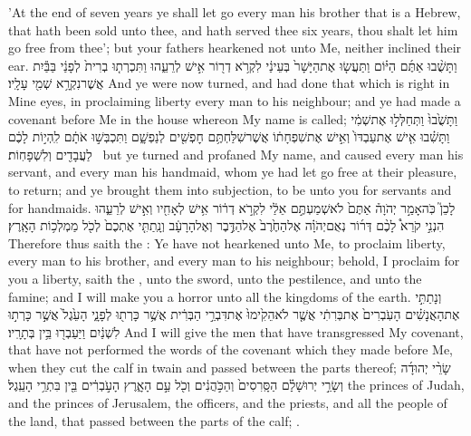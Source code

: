 {’At the end of seven years ye shall let go every man his brother that is a Hebrew, that hath been sold unto thee, and hath served thee six years, thou shalt let him go free from thee’; but your fathers hearkened not unto Me, neither inclined their ear.}
{וַתָּשֻׁ֨בוּ אַתֶּ֜ם הַיּ֗וֹם וַתַּעֲשׂ֤וּ אֶת\maqqaf הַיָּשָׁר֙ בְּעֵינַ֔י לִקְרֹ֥א דְר֖וֹר אִ֣ישׁ לְרֵעֵ֑הוּ וַתִּכְרְת֤וּ בְרִית֙ לְפָנַ֔י בַּבַּ֕יִת אֲשֶׁר\maqqaf נִקְרָ֥א שְׁמִ֖י עָלָֽיו׃}
{And ye were now turned, and had done that which is right in Mine eyes, in proclaiming liberty every man to his neighbour; and ye had made a covenant before Me in the house whereon My name is called;}
{וַתָּשֻׁ֙בוּ֙ וַתְּחַלְּל֣וּ אֶת\maqqaf שְׁמִ֔י וַתָּשִׁ֗בוּ אִ֤ישׁ אֶת\maqqaf עַבְדּוֹ֙ וְאִ֣ישׁ אֶת\maqqaf שִׁפְחָת֔וֹ אֲשֶׁר\maqqaf שִׁלַּחְתֶּ֥ם חׇפְשִׁ֖ים לְנַפְשָׁ֑ם וַתִּכְבְּשׁ֣וּ אֹתָ֔ם לִֽהְי֣וֹת לָכֶ֔ם לַעֲבָדִ֖ים וְלִשְׁפָחֽוֹת׃ \setuma }
{but ye turned and profaned My name, and caused every man his servant, and every man his handmaid, whom ye had let go free at their pleasure, to return; and ye brought them into subjection, to be unto you for servants and for handmaids.}
{לָכֵן֮ כֹּֽה\maqqaf אָמַ֣ר יְהֹוָה֒ אַתֶּם֙ לֹא\maqqaf שְׁמַעְתֶּ֣ם אֵלַ֔י לִקְרֹ֣א דְר֔וֹר אִ֥ישׁ לְאָחִ֖יו וְאִ֣ישׁ לְרֵעֵ֑הוּ הִנְנִ֣י קֹרֵא֩ לָכֶ֨ם דְּר֜וֹר נְאֻם\maqqaf יְהֹוָ֗ה אֶל\maqqaf הַחֶ֙רֶב֙ אֶל\maqqaf הַדֶּ֣בֶר וְאֶל\maqqaf הָרָעָ֔ב וְנָֽתַתִּ֤י אֶתְכֶם֙  לְכֹ֖ל מַמְלְכ֥וֹת הָאָֽרֶץ׃}
{Therefore thus saith the \lord: Ye have not hearkened unto Me, to proclaim liberty, every man to his brother, and every man to his neighbour; behold, I proclaim for you a liberty, saith the \lord, unto the sword, unto the pestilence, and unto the famine; and I will make you a horror unto all the kingdoms of the earth.}
{וְנָתַתִּ֣י אֶת\maqqaf הָאֲנָשִׁ֗ים הָעֹֽבְרִים֙ אֶת\maqqaf בְּרִתִ֔י אֲשֶׁ֤ר לֹא\maqqaf הֵקִ֙ימוּ֙ אֶת\maqqaf דִּבְרֵ֣י הַבְּרִ֔ית אֲשֶׁ֥ר כָּרְת֖וּ לְפָנָ֑י הָעֵ֙גֶל֙ אֲשֶׁ֣ר כָּרְת֣וּ לִשְׁנַ֔יִם וַיַּעַבְר֖וּ בֵּ֥ין בְּתָרָֽיו׃}
{And I will give the men that have transgressed My covenant, that have not performed the words of the covenant which they made before Me, when they cut the calf in twain and passed between the parts thereof;}
{שָׂרֵ֨י יְהוּדָ֜ה וְשָׂרֵ֣י יְרוּשָׁלַ֗͏ִם הַסָּֽרִסִים֙ וְהַכֹּ֣הֲנִ֔ים וְכֹ֖ל עַ֣ם הָאָ֑רֶץ הָעֹ֣בְרִ֔ים בֵּ֖ין בִּתְרֵ֥י הָעֵֽגֶל׃}
{the princes of Judah, and the princes of Jerusalem, the officers, and the priests, and all the people of the land, that passed between the parts of the calf; .}
